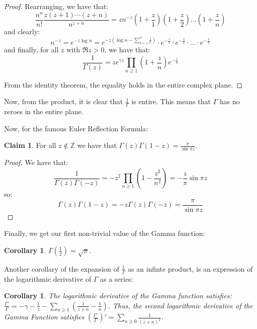 \documentclass[11pt]{article} %
\newtheorem{corollary}[theorem]{Corollary}
\theoremstyle{definition}
\newtheorem{claim}[theorem]{Claim}
\begin{document}
\begin{proof}
Rearranging, we have that:
\[ \frac{n^n}{n!}\frac{z\left(z+1\right)\cdots\left(z+n\right)}{n^{z+n}} = z n^{-z} \left(1 + \frac{z}{1}\right)\left(1 + \frac{z}{2}\right)\dots\left(1 + \frac{z}{n}\right)\]
and clearly:
\[n^{-z} = e^{-z\log n} = e^{-z\left(\log n - \sum_{k=1}^n\frac{1}{k}\right)} \cdot e^{-\frac{z}{1}} \cdot e^{-\frac{z}{2}}\cdot \dots \cdot e^{-\frac{1}{n}}\]
and finally, for all $z$ with $\Re z > 0$, we have that:
\[ \frac{1}{\Gamma\left(z\right)} = ze^{\gamma z}\prod_{n\geq1}\left(1+\frac{z}{n}\right)e^{-\frac{z}{n}}\]

From the identity theorem, the equality holds in the entire complex plane.
\end{proof}

Now, from the product, it is clear that $\frac{1}{\Gamma}$ is entire. This means that $\Gamma$ has no zeroes in the entire plane.

Now, for the famous Euler Reflection Formula:

\begin{claim}
For all $z \notin \mathbb{Z}$ we have that $\Gamma\left(z\right)\Gamma\left(1-z\right) = \frac{\pi}{\sin\pi z}$.
\end{claim}

\begin{proof}
We have that:
\[
\frac{1}{\Gamma\left(z\right)\Gamma\left(-z\right)} = -z^2 \prod_{n\geq 1}\left(1 - \frac{z^2}{n^2}\right) = -\frac{z}{\pi}\sin\pi z
\]
so:
\[ \Gamma\left(z\right)\Gamma\left(1-z\right) = -z\Gamma\left(z\right)\Gamma\left(-z\right) = \frac{\pi}{\sin\pi z} \]
\end{proof}

Finally, we get our first non-trivial value of the Gamma function:

\begin{corollary}
$\Gamma\left(\frac{1}{2}\right) = \sqrt{\pi}$.
\end{corollary}

Another corollary of the expansion of $\frac{1}{\Gamma}$ as an infinte product, is an expression of the logarithmic derivative of $\Gamma$ as a series:

\begin{corollary}
The logarithmic derivative of the Gamma function satisfies: $\frac{\Gamma'}{\Gamma} = -\gamma - \frac{1}{z} - \sum_{n\geq 1}\left(\frac{1}{z+n} - \frac{1}{n}\right)$. Thus, the second logarithmic derivative of the Gamma Function satisfies $\left(\frac{\Gamma'}{\Gamma}\right)' = \sum _{n \geq 0}\frac{1}{\left(z+n\right)^2}$.
\end{corollary}
\end{document}
